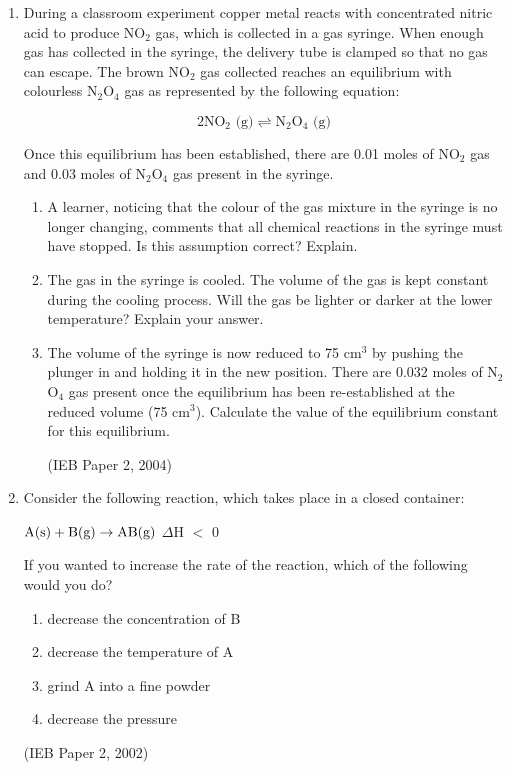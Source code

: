 {\begin{enumerate}
\item{During a classroom experiment copper metal reacts with concentrated nitric acid to produce NO$_{2}$ gas, which is collected in a gas syringe. When enough gas has collected in the syringe, the delivery tube is clamped so that no gas can escape. The brown NO$_{2}$ gas collected reaches an equilibrium with colourless N$_{2}$O$_{4}$ gas as represented by the following equation:

\begin{equation*}
2\text{NO}_{2} \text{ (g)} \rightleftharpoons \text{N}_{2}\text{O}_{4} \text{ (g)}
\end{equation*}

Once this equilibrium has been established, there are 0.01 moles of NO$_{2}$ gas and 0.03 moles of N$_{2}$O$_{4}$ gas present in the syringe.

	\begin{enumerate}
	\item{A learner, noticing that the colour of the gas mixture in the syringe is no longer changing, comments that all chemical reactions in the syringe must have stopped. Is this assumption correct? Explain.}
	\item{The gas in the syringe is cooled. The volume of the gas is kept constant during the cooling process. Will the gas be lighter or darker at the lower temperature? Explain your answer.}
	\item{The volume of the syringe is now reduced to 75 cm$^{3}$ by pushing the plunger in and holding it in the new position. There are 0.032 moles of N$_{2}$O$_{4}$ gas present once the equilibrium has been re-established at the reduced volume (75 cm$^{3}$). Calculate the value of the equilibrium constant for this equilibrium.}

(IEB Paper 2, 2004)
	\end{enumerate}
}

\item{Consider the following reaction, which takes place in a closed container:

\begin{center}
$\rm{A (s) + B (g) \rightarrow AB (g)}$ \hspace{1cm} $\Delta$H $<$ 0
\end{center}

If you wanted to increase the rate of the reaction, which of the following would you do?
	\begin{enumerate}
	\item{decrease the concentration of B}
	\item{decrease the temperature of A}
	\item{grind A into a fine powder}
	\item{decrease the pressure}
	\end{enumerate}
(IEB Paper 2, 2002)
}


\end{enumerate}}
